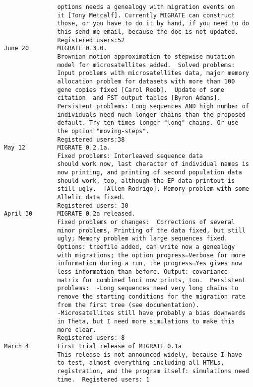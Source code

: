 \begin{small}
\begin{verbatim}
               options needs a genealogy with migration events on
               it [Tony Metcalf]. Currently MIGRATE can construct 
               those, or you have to do it by hand, if you need to do 
               this send me email, because the doc is not updated. 
               Registered users:52
June 20        MIGRATE 0.3.0. 
               Brownian motion approximation to stepwise mutation
               model for microsatellites added.  Solved problems:
               Input problems with microsatellites data, major memory
               allocation problem for datasets with more than 100
               gene copies fixed [Carol Reeb].  Update of some
               citation  and FST output tables [Byron Adams].
               Persistent problems: Long sequences AND high number of
               individuals need nuch longer chains than the proposed
               default. Try ten times longer "long" chains. Or use
               the option "moving-steps".  
               Registered users:38
May 12         MIGRATE 0.2.1a. 
               Fixed problems: Interleaved sequence data
               should work now, last character of individual names is
               now printing, and printing of second population data
               should work, too, although the EP data printout is
               still ugly.  [Allen Rodrigo]. Memory problem with some
               Allelic data fixed.  
               Registered users: 30
April 30       MIGRATE 0.2a released.
               Fixed problems or changes:  Corrections of several
               minor problems, Printing of the data fixed, but still
               ugly; Memory problem with large sequences fixed.
               Options: treefile added, can write now a genealogy
               with migrations; the option progress=Verbose for more
               information during a run, the progress=Yes gives now
               less information than before. Output: covariance
               matrix for combined loci now prints, too.  Persistent
               problems:  -Long sequences need very long chains to
               remove the starting conditions for the migration rate
               from the first tree (see documentation).
               -Microsatellites still have probably a bias downwards
               in Theta, but I need more simulations to make this
               more clear.  
               Registered users: 8
March 4        First trial release of MIGRATE 0.1a
               This release is not announced widely, because I have
               to test, almost everything including all HTMLs,
               registration, and the program itself: simulations need
               time.  Registered users: 1
\end{verbatim}
\end{small}
